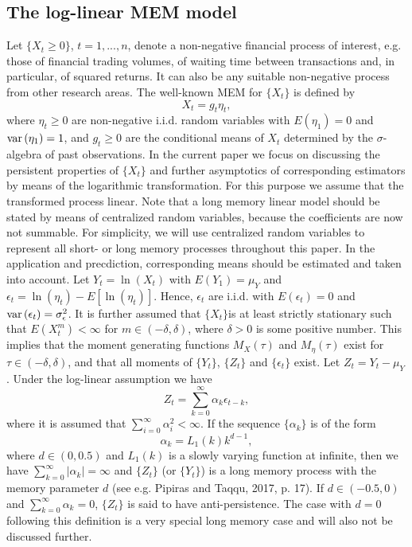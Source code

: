 \documentclass[12pt]{article}
\newcommand{\var}{\mbox{var\,}}
\begin{document}
\subsection{The log-linear MEM model}

Let $\{X_{t}\ge0\}$, $t=1,...,n$, denote a non-negative financial process of interest, e.g. those of financial trading volumes, of waiting time between transactions and, in particular, of squared returns. It can also be any suitable non-negative process from other research areas. The well-known MEM for $\{X_t\}$ is defined by%
\begin{equation}\label{MEM}
X_{t}=g_{t}\eta_{t}, %
\end{equation}
where $\eta_{t}\ge0$ are non-negative i.i.d. random variables with $E(\eta_1)=0$ and $\var(\eta_1)=1$, and $g_{t}\ge0$ are the conditional means
of $X_{t}$ determined by the $\sigma$-algebra of past observations. In the current paper we focus on discussing the persistent properties of $\{X_t\}$ and further asymptotics of corresponding estimators by means of the logarithmic transformation. For this purpose we assume that the transformed process linear. Note that a long memory linear model should be stated by means of centralized random variables, because the coefficients are now not summable. For simplicity, we will use centralized random variables to represent all short- or long memory processes throughout this paper. In the application and precdiction, corresponding means should be estimated and taken into account.   
Let $Y_t=\ln(X_t)$ with $E(Y_1)=\mu_Y$ and $\epsilon_t=\ln(\eta_t)-E[\ln(\eta_t)]$. Hence, $\epsilon_t$ are i.i.d. with $E(\epsilon_t)=0$ and $\var(\epsilon_t)=\sigma^2_{\epsilon}$. It is further assumed that $\{X_t\}$is at least strictly stationary such that $E(X_t^m)<\infty$ for $m\in(-\delta, \delta)$, where $\delta>0$ is some positive number. This implies that the moment generating functions $M_X(\tau)$ and $M_\eta(\tau)$  exist for $\tau\in(-\delta, \delta)$, and that all moments of $\{Y_t\}$, $\{Z_t\}$ and $\{\epsilon_t\}$ exist. Let $Z_t=Y_t-\mu_Y$. Under the log-linear assumption we have 
\begin{equation}\label{LFZt}
Z_{t}=\sum_{k=0}^{\infty}\alpha_{k}\epsilon_{t-k}, %
\end{equation}
where it is assumed that $\sum_{i=0}^\infty\alpha_i^2<\infty$. If the sequence $\{\alpha_k\}$ is of the form
\begin{equation}\label{AL1} 
\alpha_k = L_1(k) k^{d-1},
\end{equation}
where $d\in(0, 0.5)$ and $L_1(k)$ is a slowly varying function at infinite, then we have $\sum_{k=0}^\infty|\alpha_k|=\infty$ and $\{Z_t\}$ (or $\{Y_t\}$) is a long memory process with the memory parameter $d$ (see e.g. Pipiras and Taqqu, 2017, p. 17). If $d\in(-0.5, 0)$ and $\sum_{k=0}^\infty \alpha_k =0$, $\{Z_t\}$ is said to have anti-persistence. The case with $d=0$ following this definition is a very special long memory case and will also not be discussed further.  
\end{document}
